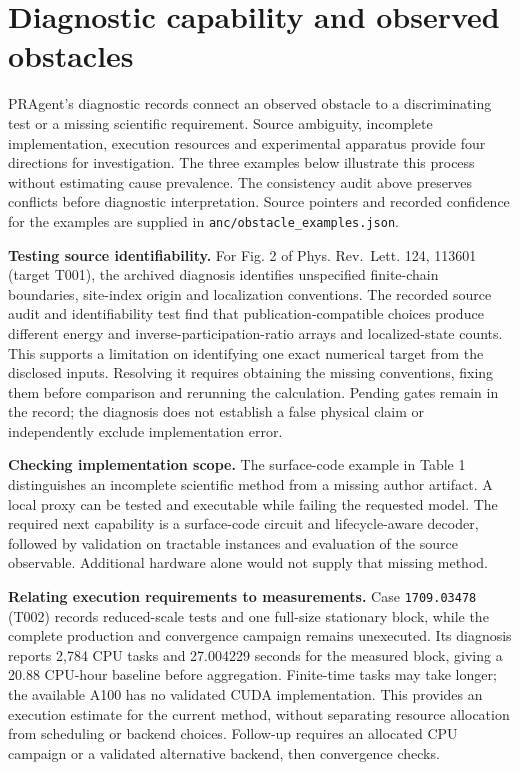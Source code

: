 \documentclass[10pt,a4paper]{article}
\begin{document}
\section{Diagnostic capability and observed
obstacles}\label{diagnostic-capability-and-observed-obstacles}

PRAgent's diagnostic records connect an observed obstacle to a
discriminating test or a missing scientific requirement. Source
ambiguity, incomplete implementation, execution resources and
experimental apparatus provide four directions for investigation. The
three examples below illustrate this process without estimating cause
prevalence. The consistency audit above preserves conflicts before
diagnostic interpretation. Source pointers and recorded confidence for
the examples are supplied in \texttt{anc/obstacle\_examples.json}.

\textbf{Testing source identifiability.} For Fig. 2 of Phys. Rev.~Lett.
124, 113601 (target T001), the archived diagnosis identifies unspecified
finite-chain boundaries, site-index origin and localization conventions.
The recorded source audit and identifiability test find that
publication-compatible choices produce different energy and
inverse-participation-ratio arrays and localized-state counts. This
supports a limitation on identifying one exact numerical target from the
disclosed inputs. Resolving it requires obtaining the missing
conventions, fixing them before comparison and rerunning the
calculation. Pending gates remain in the record; the diagnosis does not
establish a false physical claim or independently exclude implementation
error.

\textbf{Checking implementation scope.} The surface-code example in
Table 1 distinguishes an incomplete scientific method from a missing
author artifact. A local proxy can be tested and executable while
failing the requested model. The required next capability is a
surface-code circuit and lifecycle-aware decoder, followed by validation
on tractable instances and evaluation of the source observable.
Additional hardware alone would not supply that missing method.

\textbf{Relating execution requirements to measurements.} Case
\texttt{1709.03478} (T002) records reduced-scale tests and one full-size
stationary block, while the complete production and convergence campaign
remains unexecuted. Its diagnosis reports 2,784 CPU tasks and 27.004229
seconds for the measured block, giving a 20.88 CPU-hour baseline before
aggregation. Finite-time tasks may take longer; the available A100 has
no validated CUDA implementation. This provides an execution estimate
for the current method, without separating resource allocation from
scheduling or backend choices. Follow-up requires an allocated CPU
campaign or a validated alternative backend, then convergence checks.
\end{document}
